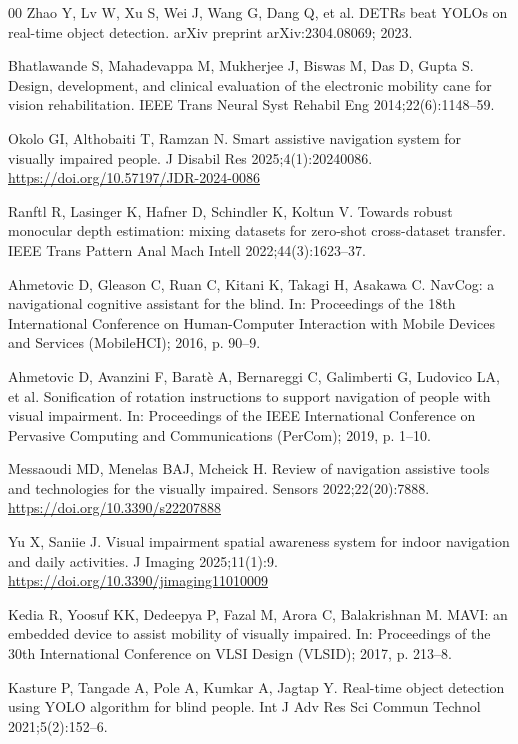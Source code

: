 \documentclass[3p,times,procedia]{elsarticle}
\begin{document}
\begin{thebibliography}{00}
Zhao Y, Lv W, Xu S, Wei J, Wang G, Dang Q, et al. DETRs beat YOLOs on
real-time object detection. arXiv preprint arXiv:2304.08069; 2023.

Bhatlawande S, Mahadevappa M, Mukherjee J, Biswas M, Das D, Gupta S. Design,
development, and clinical evaluation of the electronic mobility cane for
vision rehabilitation. IEEE Trans Neural Syst Rehabil Eng
2014;22(6):1148--59.

Okolo GI, Althobaiti T, Ramzan N. Smart assistive navigation system for
visually impaired people. J Disabil Res 2025;4(1):20240086.
\url{https://doi.org/10.57197/JDR-2024-0086}

Ranftl R, Lasinger K, Hafner D, Schindler K, Koltun V. Towards robust
monocular depth estimation: mixing datasets for zero-shot cross-dataset
transfer. IEEE Trans Pattern Anal Mach Intell 2022;44(3):1623--37.

Ahmetovic D, Gleason C, Ruan C, Kitani K, Takagi H, Asakawa C. NavCog: a
navigational cognitive assistant for the blind. In: Proceedings of the 18th
International Conference on Human-Computer Interaction with Mobile Devices
and Services (MobileHCI); 2016, p. 90--9.

Ahmetovic D, Avanzini F, Barat\`{e} A, Bernareggi C, Galimberti G, Ludovico
LA, et al. Sonification of rotation instructions to support navigation of
people with visual impairment. In: Proceedings of the IEEE International
Conference on Pervasive Computing and Communications (PerCom); 2019, p. 1--10.

Messaoudi MD, Menelas BAJ, Mcheick H. Review of navigation assistive tools
and technologies for the visually impaired. Sensors 2022;22(20):7888.
\url{https://doi.org/10.3390/s22207888}

Yu X, Saniie J. Visual impairment spatial awareness system for indoor
navigation and daily activities. J Imaging 2025;11(1):9.
\url{https://doi.org/10.3390/jimaging11010009}

Kedia R, Yoosuf KK, Dedeepya P, Fazal M, Arora C, Balakrishnan M. MAVI: an
embedded device to assist mobility of visually impaired. In: Proceedings of
the 30th International Conference on VLSI Design (VLSID); 2017, p. 213--8.

Kasture P, Tangade A, Pole A, Kumkar A, Jagtap Y. Real-time object detection
using YOLO algorithm for blind people. Int J Adv Res Sci Commun Technol
2021;5(2):152--6.


\end{thebibliography}
\end{document}
